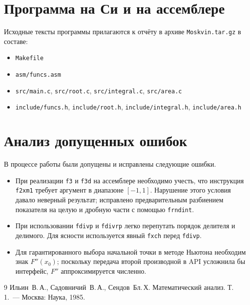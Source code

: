 \documentclass[a4paper,12pt,titlepage,finall]{article}
\begin{document}
\newpage

\section{Программа на Си и на ассемблере}

Исходные тексты программы прилагаются к отчёту в архиве
\texttt{Moskvin.tar.gz} в составе:

\begin{itemize}
    \item \texttt{Makefile}
    \item \texttt{asm/funcs.asm}
    \item \texttt{src/main.c}, \texttt{src/root.c},
          \texttt{src/integral.c}, \texttt{src/area.c}
    \item \texttt{include/funcs.h}, \texttt{include/root.h},
          \texttt{include/integral.h}, \texttt{include/area.h}
\end{itemize}

\newpage

\section{Анализ допущенных ошибок}

В процессе работы были допущены и исправлены следующие ошибки.

\begin{itemize}
    \item При реализации \texttt{f3} и \texttt{f3d} на ассемблере
          необходимо учесть, что инструкция \texttt{f2xm1} требует
          аргумент в диапазоне $[-1,1]$. Нарушение этого условия
          давало неверный результат; исправлено предварительным
          разбиением показателя на целую и дробную части
          с помощью \texttt{frndint}.
    \item При использовании \texttt{fdivp} и \texttt{fdivrp}
          легко перепутать порядок делителя и делимого. Для ясности
          используется явный \texttt{fxch} перед \texttt{fdivp}.
    \item Для гарантированного выбора начальной точки в методе
          Ньютона необходим знак $F''(x_0)$; поскольку передача
          второй производной в API усложнила бы интерфейс,
          $F''$ аппроксимируется численно.
\end{itemize}

\newpage

\begin{raggedright}
\begin{thebibliography}{9}
    Ильин~В.\,А., Садовничий~В.\,А., Сендов~Бл.\,Х.
    Математический анализ. Т.\,1.~---
    Москва: Наука, 1985.
\end{thebibliography}
\end{raggedright}
\end{document}
